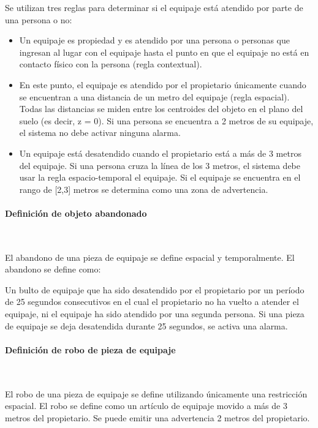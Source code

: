 Se utilizan tres reglas para determinar si el equipaje está atendido por parte de una persona o no:

\begin{itemize}
    \item Un equipaje es propiedad y es atendido por una persona o personas que ingresan al lugar con el equipaje hasta el punto en que el equipaje no está en contacto físico con la persona (regla contextual).
    \item En este punto, el equipaje es atendido por el propietario únicamente cuando se encuentran a una distancia de un metro del equipaje (regla espacial). Todas las distancias se miden entre los centroides del objeto en el plano del suelo (es decir, z = 0). Si una persona se encuentra a 2 metros de su equipaje, el sistema no debe activar ninguna alarma.
    \item Un equipaje está desatendido cuando el propietario está a más de 3 metros del equipaje. Si una persona cruza la línea de los 3 metros, el sistema debe usar la regla espacio-temporal el equipaje. Si el equipaje se encuentra en el rango de [2,3] metros se determina como una zona de advertencia.
\end{itemize}

\paragraph*{Definición de objeto abandonado}\mbox{} \\
\label{parag:definicion-abandono-objeto}

El abandono de una pieza de equipaje se define espacial y temporalmente. El abandono se define como:

Un bulto de equipaje que ha sido desatendido por el propietario por un período de 25 segundos consecutivos en el cual el propietario no ha vuelto a atender el equipaje, ni el equipaje ha sido atendido por una segunda persona. Si una pieza de equipaje se deja desatendida durante 25 segundos, se activa una alarma.

\paragraph*{Definición de robo de pieza de equipaje}\mbox{} \\
\label{parag:definicion-robo-pieza-equipaje}

El robo de una pieza de equipaje se define utilizando únicamente una restricción espacial. El robo se define como un artículo de equipaje movido a más de 3 metros del propietario. Se puede emitir una advertencia 2 metros del propietario.

